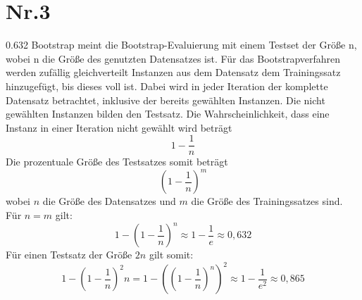 \documentclass[a4paper,11pt,twoside]{article}
\begin{document}
\section*{Nr.3}
0.632 Bootstrap meint die Bootstrap-Evaluierung mit einem Testset der Größe n, wobei n die Größe des genutzten Datensatzes ist. Für das Bootstrapverfahren werden zufällig gleichverteilt Instanzen aus dem Datensatz dem Trainingssatz hinzugefügt, bis dieses voll ist. Dabei wird in jeder Iteration der komplette Datensatz betrachtet, inklusive der bereits gewählten Instanzen. Die nicht gewählten Instanzen bilden den Testsatz.
Die Wahrscheinlichkeit, dass eine Instanz in einer Iteration nicht gewählt wird beträgt
\[ 1 - \frac{1}{n}  \]
Die prozentuale Größe des Testsatzes somit beträgt
\[ (1 - \frac{1}{n})^m \]
wobei $n$ die Größe des Datensatzes und $m$ die Größe des Trainingssatzes sind. Für $n = m$ gilt:
\[ 1 - (1 - \frac{1}{n})^n \approx 1 - \frac{1}{e} \approx 0,632 \]
Für einen Testsatz der Größe $2n$  gilt somit:
\[ 1 - (1 - \frac{1}{n})^2n = 1 - \left((1 - \frac{1}{n})^n\right)^2  \approx 1 - \frac{1}{e^2} \approx 0,865 \]
\end{document}
